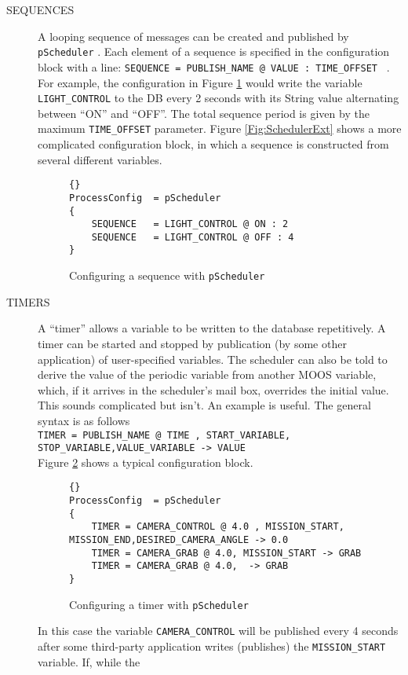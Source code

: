 \documentclass[a4paper,10pt]{article}
\newcommand{\Code}[1]{\texttt{#1} }
\newcommand{\code}[1]{\Code{#1} }
\begin{document}
\begin{description}
\item[SEQUENCES] A looping sequence of messages can be created and published by \code{pScheduler}. Each element of a
sequence is specified in the configuration block  with a line:
\code{SEQUENCE = PUBLISH\_NAME @ VALUE : TIME\_OFFSET }. For
example, the configuration in Figure \ref{Fig:Sequences} would
write the variable \code{LIGHT\_CONTROL} to the DB every 2 seconds
with its String value alternating between ``ON'' and ``OFF''. The
total sequence period is given by the maximum \code{TIME\_OFFSET}
parameter. Figure \ref{Fig:SchedulerExt} shows a more complicated
configuration block, in which a sequence is constructed from
several different variables.
\begin{figure}[ht]
\label{Fig:Sequences}
\begin{lstlisting}[]{}
ProcessConfig  = pScheduler
{
    SEQUENCE   = LIGHT_CONTROL @ ON : 2
    SEQUENCE   = LIGHT_CONTROL @ OFF : 4
}
\end{lstlisting}\caption{Configuring a sequence with \code{pScheduler}}
\end{figure}
\item[TIMERS] A ``timer'' allows a variable to be written to the
database repetitively. A timer can be started and stopped by
publication (by some other application) of user-specified
variables. The scheduler can also be told  to derive the  value of
the periodic variable from another MOOS variable, which, if it
arrives in the scheduler's mail box, overrides the initial value.
This sounds complicated but isn't. An example is useful. The
general syntax is as follows\\
\code{TIMER = PUBLISH\_NAME @ TIME , START\_VARIABLE,
STOP\_VARIABLE,VALUE\_VARIABLE -> VALUE}\\
Figure \ref{Fig:TIMER} shows a typical configuration block.
\begin{figure}[ht]
\label{Fig:TIMER}
\begin{lstlisting}[]{}
ProcessConfig  = pScheduler
{
    TIMER = CAMERA_CONTROL @ 4.0 , MISSION_START,  MISSION_END,DESIRED_CAMERA_ANGLE -> 0.0
    TIMER = CAMERA_GRAB @ 4.0, MISSION_START -> GRAB
    TIMER = CAMERA_GRAB @ 4.0,  -> GRAB
}
\end{lstlisting}\caption{Configuring a timer with \code{pScheduler}}
\end{figure}
In this case the variable \code{CAMERA\_CONTROL} will be published
every 4 seconds after some third-party application writes
(publishes) the \code{MISSION\_START} variable. If, while the

\end{description}
\end{document}
